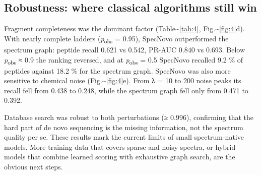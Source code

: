 \documentclass{sn-preview}
\begin{document}
\subsection{Robustness: where classical algorithms still win}

Fragment completeness was the dominant factor (Table\textasciitilde{}\ref{tab:4}, Fig.\textasciitilde{}\ref{fig:4}d). With nearly complete ladders (\emph{p}\textsubscript{obs} = 0.95), SpecNovo outperformed the spectrum graph: peptide recall 0.621 vs 0.542, PR-AUC 0.840 vs 0.693. Below \emph{p}\textsubscript{obs} ≈ 0.9 the ranking reversed, and at \emph{p}\textsubscript{obs} = 0.5 SpecNovo recalled 9.2 \% of peptides against 18.2 \% for the spectrum graph. SpecNovo was also more sensitive to chemical noise (Fig.\textasciitilde{}\ref{fig:4}e). From λ = 10 to 200 noise peaks its recall fell from 0.438 to 0.248, while the spectrum graph fell only from 0.471 to 0.392.

Database search was robust to both perturbations (≥ 0.996), confirming that the hard part of de novo sequencing is the missing information, not the spectrum quality per se. These results mark the current limits of small spectrum-native models. More training data that covers sparse and noisy spectra, or hybrid models that combine learned scoring with exhaustive graph search, are the obvious next steps.
\end{document}
